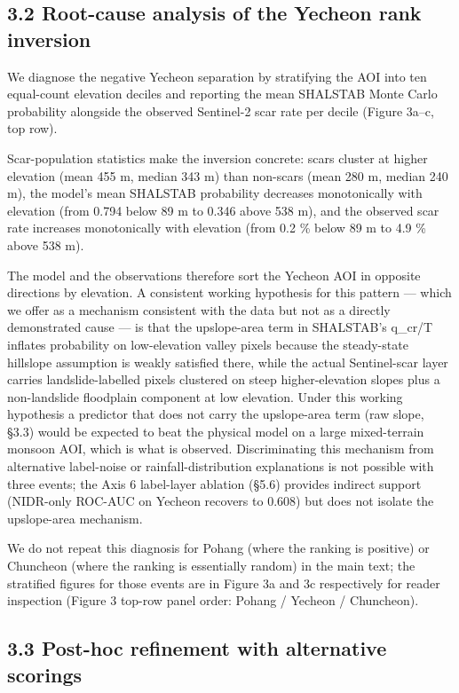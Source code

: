 \documentclass[11pt,a4paper]{article}
\begin{document}
\subsection{3.2 Root-cause analysis of the Yecheon rank inversion}\label{root-cause-analysis-of-the-yecheon-rank-inversion}

We diagnose the negative Yecheon separation by stratifying the AOI into ten equal-count elevation deciles and reporting the mean SHALSTAB Monte Carlo probability alongside the observed Sentinel-2 scar rate per decile (Figure 3a--c, top row).

Scar-population statistics make the inversion concrete: scars cluster at higher elevation (mean 455 m, median 343 m) than non-scars (mean 280 m, median 240 m), the model's mean SHALSTAB probability decreases monotonically with elevation (from 0.794 below 89 m to 0.346 above 538 m), and the observed scar rate increases monotonically with elevation (from 0.2 \% below 89 m to 4.9 \% above 538 m).

The model and the observations therefore sort the Yecheon AOI in opposite directions by elevation. A consistent working hypothesis for this pattern --- which we offer as a mechanism consistent with the data but not as a directly demonstrated cause --- is that the upslope-area term in SHALSTAB's q\_cr/T inflates probability on low-elevation valley pixels because the steady-state hillslope assumption is weakly satisfied there, while the actual Sentinel-scar layer carries landslide-labelled pixels clustered on steep higher-elevation slopes plus a non-landslide floodplain component at low elevation. Under this working hypothesis a predictor that does not carry the upslope-area term (raw slope, §3.3) would be expected to beat the physical model on a large mixed-terrain monsoon AOI, which is what is observed. Discriminating this mechanism from alternative label-noise or rainfall-distribution explanations is not possible with three events; the Axis 6 label-layer ablation (§5.6) provides indirect support (NIDR-only ROC-AUC on Yecheon recovers to 0.608) but does not isolate the upslope-area mechanism.

We do not repeat this diagnosis for Pohang (where the ranking is positive) or Chuncheon (where the ranking is essentially random) in the main text; the stratified figures for those events are in Figure 3a and 3c respectively for reader inspection (Figure 3 top-row panel order: Pohang / Yecheon / Chuncheon).

\subsection{3.3 Post-hoc refinement with alternative scorings}\label{post-hoc-refinement-with-alternative-scorings}
\end{document}
